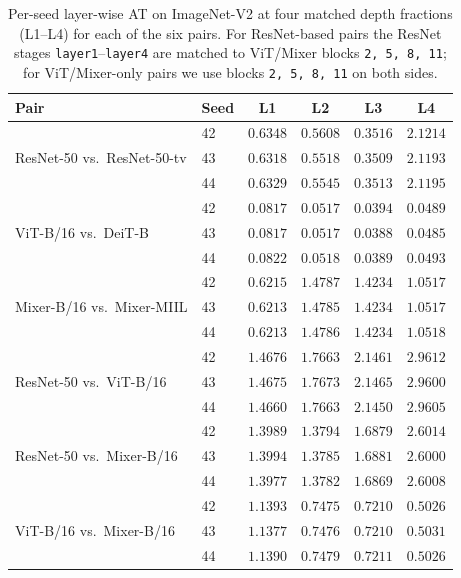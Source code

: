 \documentclass{article}
\begin{document}
\begin{table}[t]
\caption{Per-seed layer-wise AT on ImageNet-V2 at four matched depth fractions (L1--L4) for each of the six pairs. For ResNet-based pairs the ResNet stages \texttt{layer1}--\texttt{layer4} are matched to ViT/Mixer blocks \texttt{2, 5, 8, 11}; for ViT/Mixer-only pairs we use blocks \texttt{2, 5, 8, 11} on both sides.}
\label{tab:per_seed_imagenet_layers}
\centering
\small
\begin{tabular}{@{}llcccc@{}}
\toprule
Pair & Seed & L1 & L2 & L3 & L4 \\
\midrule
\multirow{3}{*}{ResNet-50 vs.\ ResNet-50-tv}
 & 42 & $0.6348$ & $0.5608$ & $0.3516$ & $2.1214$ \\
 & 43 & $0.6318$ & $0.5518$ & $0.3509$ & $2.1193$ \\
 & 44 & $0.6329$ & $0.5545$ & $0.3513$ & $2.1195$ \\
\midrule
\multirow{3}{*}{ViT-B/16 vs.\ DeiT-B}
 & 42 & $0.0817$ & $0.0517$ & $0.0394$ & $0.0489$ \\
 & 43 & $0.0817$ & $0.0517$ & $0.0388$ & $0.0485$ \\
 & 44 & $0.0822$ & $0.0518$ & $0.0389$ & $0.0493$ \\
\midrule
\multirow{3}{*}{Mixer-B/16 vs.\ Mixer-MIIL}
 & 42 & $0.6215$ & $1.4787$ & $1.4234$ & $1.0517$ \\
 & 43 & $0.6213$ & $1.4785$ & $1.4234$ & $1.0517$ \\
 & 44 & $0.6213$ & $1.4786$ & $1.4234$ & $1.0518$ \\
\midrule
\multirow{3}{*}{ResNet-50 vs.\ ViT-B/16}
 & 42 & $1.4676$ & $1.7663$ & $2.1461$ & $2.9612$ \\
 & 43 & $1.4675$ & $1.7673$ & $2.1465$ & $2.9600$ \\
 & 44 & $1.4660$ & $1.7663$ & $2.1450$ & $2.9605$ \\
\midrule
\multirow{3}{*}{ResNet-50 vs.\ Mixer-B/16}
 & 42 & $1.3989$ & $1.3794$ & $1.6879$ & $2.6014$ \\
 & 43 & $1.3994$ & $1.3785$ & $1.6881$ & $2.6000$ \\
 & 44 & $1.3977$ & $1.3782$ & $1.6869$ & $2.6008$ \\
\midrule
\multirow{3}{*}{ViT-B/16 vs.\ Mixer-B/16}
 & 42 & $1.1393$ & $0.7475$ & $0.7210$ & $0.5026$ \\
 & 43 & $1.1377$ & $0.7476$ & $0.7210$ & $0.5031$ \\
 & 44 & $1.1390$ & $0.7479$ & $0.7211$ & $0.5026$ \\
\bottomrule
\end{tabular}
\end{table}
\end{document}
